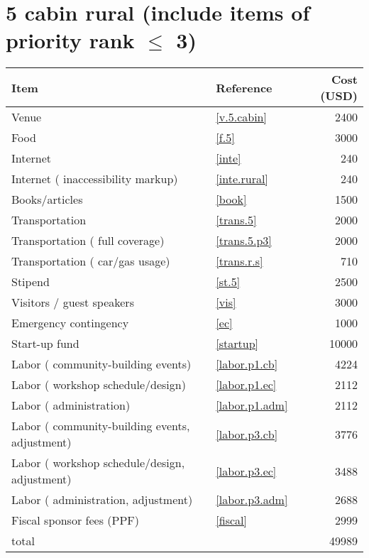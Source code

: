 \section*{5 cabin rural (include items of priority rank $\leq$ 3)}
\begin{center}
\begin{tabular}{llr}
Item & Reference & Cost (USD) \\ \hline
Venue & \ref{v.5.cabin} & 2400 \\
Food & \ref{f.5} & 3000 \\
Internet & \ref{inte} & 240 \\
Internet ( inaccessibility markup) & \ref{inte.rural} & 240 \\
Books/articles & \ref{book} & 1500 \\
Transportation & \ref{trans.5} & 2000 \\
Transportation ( full coverage) & \ref{trans.5.p3} & 2000 \\
Transportation ( car/gas usage) & \ref{trans.r.s} & 710 \\
Stipend & \ref{st.5} & 2500 \\
Visitors / guest speakers & \ref{vis} & 3000 \\
Emergency contingency & \ref{ec} & 1000 \\
Start-up fund & \ref{startup} & 10000 \\
Labor ( community-building events) & \ref{labor.p1.cb} & 4224 \\
Labor ( workshop schedule/design) & \ref{labor.p1.ec} & 2112 \\
Labor ( administration) & \ref{labor.p1.adm} & 2112 \\
Labor ( community-building events, adjustment) & \ref{labor.p3.cb} & 3776 \\
Labor ( workshop schedule/design, adjustment) & \ref{labor.p3.ec} & 3488 \\
Labor ( administration, adjustment) & \ref{labor.p3.adm} & 2688 \\
Fiscal sponsor fees (PPF) & \ref{fiscal} & 2999 \\ \hline
total &  & 49989
\end{tabular}
\end{center}
\newpage
